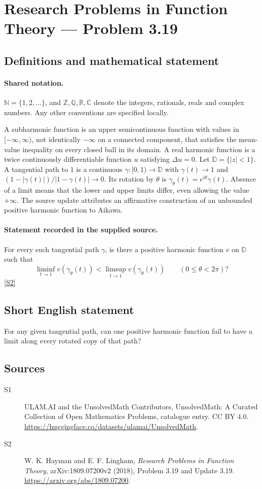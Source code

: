 \documentclass[11pt]{article}
\newcommand{\sref}[2]{\hyperlink{source:#1:#2}{[S#2]}}
\begin{document}
\section{Research Problems in Function Theory — Problem 3.19}\label{statement}

\subsection{Definitions and mathematical statement}

\paragraph{Shared notation.}$\mathbb N=\{1,2,\ldots\}$, and $\mathbb Z,\mathbb Q,\mathbb R,\mathbb C$ denote the integers, rationals, reals and complex numbers. Any other conventions are specified locally.


A subharmonic function is an upper semicontinuous function with values in $[-\infty,\infty)$, not identically $-\infty$ on a connected component, that satisfies the mean-value inequality on every closed ball in its domain. A real harmonic function is a twice continuously differentiable function $u$ satisfying $\Delta u=0$. Let $\mathbb D=\{|z|<1\}$. A tangential path to $1$ is a continuous $\gamma:[0,1)\to\mathbb D$ with $\gamma(t)\to1$ and $(1-|\gamma(t)|)/|1-\gamma(t)|\to0$. Its rotation by $\theta$ is $\gamma_\theta(t)=e^{i\theta}\gamma(t)$. Absence of a limit means that the lower and upper limits differ, even allowing the value $+\infty$.
The source update attributes an affirmative construction of an unbounded positive harmonic function to Aikawa.
\paragraph{Statement recorded in the supplied source.}
For every such tangential path $\gamma$, is there a positive harmonic function $v$ on $\mathbb D$ such that
\[\liminf_{t\to1}v(\gamma_\theta(t))<\limsup_{t\to1}v(\gamma_\theta(t))\qquad(0\leq\theta<2\pi)?\] \sref{statement}{2}
\subsection{Short English statement}
For any given tangential path, can one positive harmonic function fail to have a limit along every rotated copy of that path?
\subsection{Sources}
\begin{description}
\item[\hypertarget{source:statement:1}{S1}] ULAM.AI and the UnsolvedMath Contributors, UnsolvedMath: A Curated Collection of Open Mathematics Problems, catalogue entry. CC BY 4.0. \url{https://huggingface.co/datasets/ulamai/UnsolvedMath}.
\item[\hypertarget{source:statement:2}{S2}] W. K. Hayman and E. F. Lingham, \emph{Research Problems in Function Theory}, arXiv:1809.07200v2 (2018), Problem 3.19 and Update 3.19. \url{https://arxiv.org/abs/1809.07200}.
\end{description}
\label{end:statement}
\end{document}
